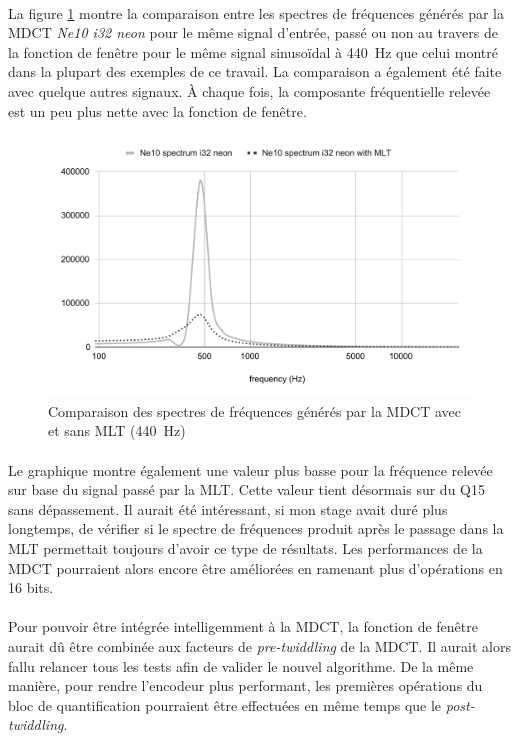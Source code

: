 \documentclass{article}
\begin{document}
    \paragraph{}
    La figure \ref{fig:spectre_mlt} montre la comparaison entre les spectres de fréquences générés par la MDCT \emph{Ne10 i32 neon} pour le même signal d'entrée, passé ou non au travers de la fonction de fenêtre pour le même signal sinusoïdal à \SI{440}{\hertz} que celui montré dans la plupart des exemples de ce travail. La comparaison a également été faite avec quelque autres signaux. À chaque fois, la composante fréquentielle relevée est un peu plus nette avec la fonction de fenêtre.
    \begin{figure}[H]
        \centering
        \includegraphics[width=.8\linewidth]{./images/validation_ne10_i32_neon_mlt.pdf}
        \caption{Comparaison des spectres de fréquences générés par la MDCT avec et sans MLT (\SI{440}{\hertz})}
        \label{fig:spectre_mlt}
    \end{figure}

    \paragraph{}
    Le graphique montre également une valeur plus basse pour la fréquence relevée sur base du signal passé par la MLT. Cette valeur tient désormais sur du Q15 sans dépassement. Il aurait été intéressant, si mon stage avait duré plus longtemps, de vérifier si le spectre de fréquences produit après le passage dans la MLT permettait toujours d'avoir ce type de résultats. Les performances de la MDCT pourraient alors encore être améliorées en ramenant plus d'opérations en 16 bits.

    \paragraph{}
    Pour pouvoir être intégrée intelligemment à la MDCT, la fonction de fenêtre aurait dû être combinée aux facteurs de \emph{pre-twiddling} de la MDCT. Il aurait alors fallu relancer tous les tests afin de valider le nouvel algorithme. De la même manière, pour rendre l'encodeur plus performant, les premières opérations du bloc de quantification pourraient être effectuées en même temps que le \emph{post-twiddling}.
\end{document}
